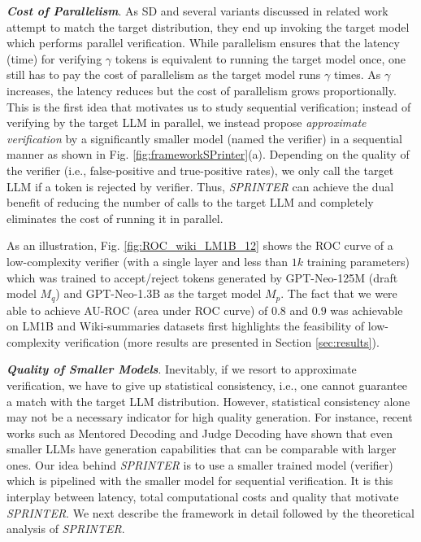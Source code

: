 \documentclass{article}
\newcommand{\revision}[1]{{\color{black} #1}}
\theoremstyle{plain}
\theoremstyle{definition}
\theoremstyle{remark}
\begin{document}
\textit{\textbf{Cost of Parallelism}}. As SD and several variants discussed in related work attempt to match the target distribution, they end up invoking the target model which performs parallel verification. While parallelism ensures that the latency (time) for verifying $\gamma$ tokens is equivalent to running the target model once, one still has to pay the cost of parallelism as the target model runs $\gamma$ times. As $\gamma$ increases, the latency reduces but the cost of parallelism grows proportionally. This is the first idea that motivates us to study sequential verification; instead of verifying by the target LLM in parallel, we instead propose \textit{approximate verification} by a significantly smaller model (named the verifier) in a sequential manner as shown in Fig. \ref{fig:frameworkSPrinter}(a). Depending on the quality of the verifier (i.e., false-positive and true-positive rates), we only call the target LLM if a token is rejected by verifier. Thus, \textit{SPRINTER} can achieve the dual benefit of reducing the number of calls to the target LLM and completely eliminates the cost of running it in parallel. 

As an illustration, Fig. \ref{fig:ROC_wiki_LM1B_12} shows the ROC curve of a low-complexity verifier (with a single layer and less than $1k$ training parameters) which was trained to accept/reject tokens generated by GPT-Neo-125M (draft model $M_q$) and  GPT-Neo-1.3B as the target model $M_p$. The fact that we were able to achieve AU-ROC (area under ROC curve) of $0.8$ and $0.9$ was achievable on LM1B and Wiki-summaries datasets first highlights the feasibility of low-complexity verification (more results are presented in Section \ref{sec:results}). 



\textit{\textbf{Quality of Smaller Models}}. \revision{Inevitably, if we resort to approximate verification, we have to give up statistical consistency, i.e., one cannot guarantee a match with the target LLM distribution. However, statistical consistency alone may not be a necessary indicator for high quality generation. For instance, recent works such as Mentored Decoding \cite{tranthien2024mentored} and Judge Decoding \cite{judge} have shown that even smaller LLMs have generation capabilities that can be comparable with larger ones. 
Our idea behind \textit{SPRINTER} is to use a smaller trained model (verifier) which is pipelined with the smaller model for sequential verification. It is this interplay between latency, total computational costs and quality that motivate \textit{SPRINTER}. We next describe the framework in detail followed by the theoretical analysis of \textit{SPRINTER}. }
\end{document}

